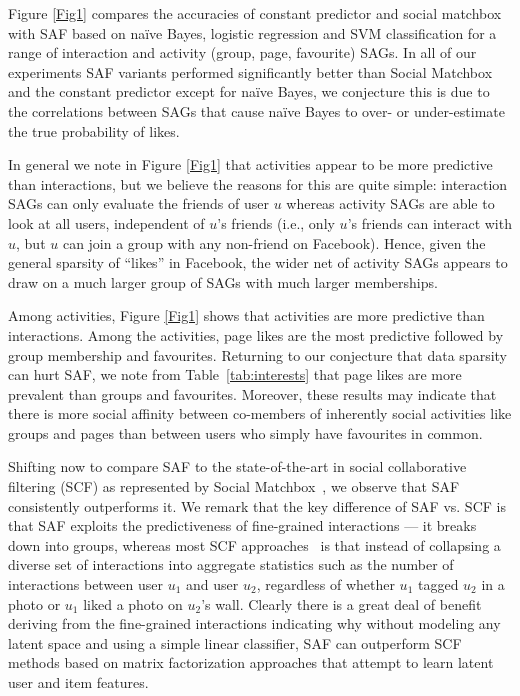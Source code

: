 Figure \ref{Fig1} compares the accuracies of constant predictor and
social matchbox with SAF based on na\"{i}ve Bayes, logistic regression
and SVM classification for a range of interaction and activity (group,
page, favourite) SAGs.  In all of our experiments SAF variants
performed significantly better than Social Matchbox and the constant
predictor except for na\"{i}ve Bayes, we conjecture this is due to the
correlations between SAGs that cause na\"{i}ve Bayes to over- or
under-estimate the true probability of likes.

In general we note in Figure \ref{Fig1} that activities appear to be
more predictive than interactions, but we believe the reasons for this
are quite simple: interaction SAGs can only evaluate the friends of
user $u$ whereas activity SAGs are able to look at all users,
independent of $u$'s friends (i.e., only $u$'s friends can interact
with $u$, but $u$ can join a group with any non-friend on Facebook).
Hence, given the general sparsity of ``likes'' in Facebook, the wider
net of activity SAGs appears to draw on a much larger group of SAGs
with much larger memberships.

Among activities, Figure \ref{Fig1} shows that activities are more
predictive than interactions. Among the activities, page likes are the
most predictive followed by group membership and favourites.
Returning to our conjecture that data sparsity can hurt SAF, we note
from Table~\ref{tab:interests} that page likes are more prevalent than
groups and favourites.  Moreover, these results may indicate that
there is more social affinity between co-members of inherently social
activities like groups and pages than between users who simply have
favourites in common.

Shifting now to compare SAF to the state-of-the-art in social
collaborative filtering (SCF) as represented by Social
Matchbox~\cite{Noel2012NOF}, we observe that SAF consistently
outperforms it.  We remark that the key difference of SAF vs. SCF is
that SAF exploits the predictiveness of fine-grained interactions ---
it breaks down into groups, whereas most SCF
approaches~\cite{Noel2012NOF,lla,socinf,sr,rrmf,sorec,ste} is that
instead of collapsing a diverse set of interactions into aggregate
statistics such as the number of interactions between user $u_1$ and
user $u_2$, regardless of whether $u_1$ tagged $u_2$ in a photo or
$u_1$ liked a photo on $u_2$'s wall.  Clearly there is a great deal of
benefit deriving from the fine-grained interactions indicating why
without modeling any latent space and using a simple linear
classifier, SAF can outperform SCF methods based on matrix
factorization approaches that attempt to learn latent user and item
features.

